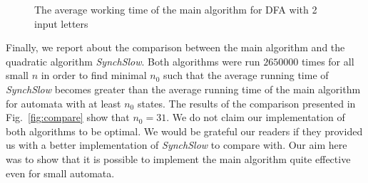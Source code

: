 \documentclass{jalc}
\begin{document}
\begin{figure}
\centering
{}
\caption{The average working time of the main algorithm for DFA with 2 input letters}
\label{fig:maintime}
\end{figure}


Finally, we report about the comparison between the main algorithm and the quadratic algorithm \emph{SynchSlow}. Both algorithms were run $2650000$ times for all small $n$ in order to find minimal $n_0$ such that the average running time of \emph{SynchSlow} becomes greater than the average running time of the main algorithm for automata with at least $n_0$ states. The results of the comparison presented in Fig.~\ref{fig:compare} show that $n_0=31$. We do not claim our implementation of both algorithms to be optimal. We would be grateful our readers if they provided us with a better implementation of \emph{SynchSlow} to compare with. Our aim here was to show that it is possible to implement the main algorithm quite effective even for small automata.
\end{document}
